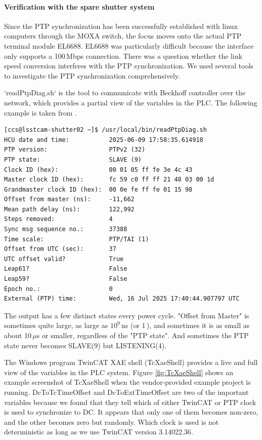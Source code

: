 \paragraph{Verification with the spare shutter system}
Since the PTP synchronization has been successfully established with linux computers through the MOXA switch, the focus moves onto the actual PTP terminal module EL6688.  EL6688 was particularly difficult because the interface only supports a 100\,Mbps connection. There was a question whether the link speed conversion interferes with the PTP synchronization. We used several tools to investigate the PTP synchronization comprehensively.

`readPtpDiag.sh` is the tool to communicate with Beckhoff controller over the network, which provides a partial view of the variables in the PLC. The following example is taken from \cite{CTN-003}.
\begin{lstlisting}
[ccs@lsstcam-shutter02 ~]$ /usr/local/bin/readPtpDiag.sh 
HCU date and time:           2025-06-09 17:58:35.614918
PTP version:                 PTPv2 (32)
PTP state:                   SLAVE (9)
Clock ID (hex):              00 01 05 ff fe 3e 4c 43
Master clock ID (hex):       fc 59 c0 ff ff 21 48 03 00 1d
Grandmaster clock ID (hex):  00 0e fe ff fe 01 15 98
Offset from master (ns):     -11,662
Mean path delay (ns):        122,992
Steps removed:               4
Sync msg sequence no.:       37388
Time scale:                  PTP/TAI (1)
Offset from UTC (sec):       37
UTC offset valid?            True
Leap61?                      False
Leap59?                      False
Epoch no.:                   0
External (PTP) time:         Wed, 16 Jul 2025 17:40:44.907797 UTC
\end{lstlisting}
The output has a few distinct states every power cycle. "Offset from Master" is sometimes quite large, as large as $10^9$\,ns (or 1\,), and sometimes it is as small as about 10$\,\mu$s or smaller, regardless of the "PTP state". And sometimes the PTP state never becomes SLAVE(9) but LISTENING(4).


The Windows program TwinCAT XAE shell (TcXaeShell) provides a live and full view of the variables in the PLC system. Figure \ref{fig:TcXaeShell} shows an example screenshot of TcXaeShell when the vendor-provided example project is running. DcToTcTimeOffset and DcToExtTimeOffset are two of the important variables because we found that they tell which of either TwinCAT or PTP clock is used to synchronize to DC. It appears that only one of them becomes non-zero, and the other becomes zero but randomly. Which clock is used is not deterministic as long as we use TwinCAT version 3.14022.36.

